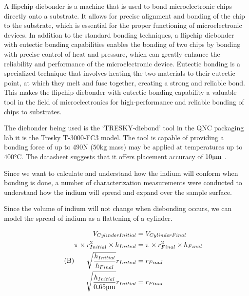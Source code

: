 A flipchip diebonder is a machine that is used to bond microelectronic chips directly onto a substrate. It allows for precise alignment and bonding of the chip to the substrate, which is essential for the proper functioning of microelectronic devices. In addition to the standard bonding techniques, a flipchip diebonder with eutectic bonding capabilities enables the bonding of two chips by bonding with precise control of heat and pressure, which can greatly enhance the reliability and performance of the microelectronic device. Eutectic bonding is a specialized technique that involves heating the two materials to their eutectic point, at which they melt and fuse together, creating a strong and reliable bond. This makes the flipchip diebonder with eutectic bonding capability a valuable tool in the field of microelectronics for high-performance and reliable bonding of chips to substrates.


The diebonder being used is the `TRESKY-diebond' tool in the QNC packaging lab it is the Tresky T-3000-FC3 model.
The tool is capable of providing a bonding force of up to $490 \unit{\newton}$ ($50 \unit{\kg}$ mass) may be applied at temperatures up to $400\unit{\degreeCelsius}$. The datasheet suggests that it offers placement accuracy of $10\um$ \cite{diebonderDatasheet}.


Since we want to calculate and understand how the indium will conform when bonding is done, a number of characterization measurements were conducted to understand how the indium will spread and expand over the sample surface.

Since the volume of indium will not change when diebonding occurs, we can model the spread of indium as a flattening of a cylinder.

\begin{equation}\tag{B}
    \begin{split}
        V_{Cylinder Initial} &= V_{Cylinder Final} \\
        \pi \times r_{Initial}^2 \times h_{Initial} &= \pi \times r_{Final}^2 \times h_{Final} \\
        \sqrt{\frac{h_{Initial}}{h_{Final}}} r_{Initial} &= r_{Final} \\
        \sqrt{\frac{h_{Initial}}{ 0.65 \um}} r_{Initial} &= r_{Final}
    \end{split}
\end{equation}



